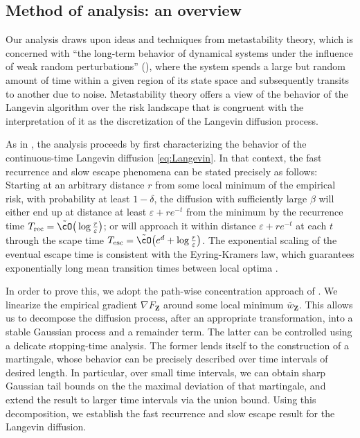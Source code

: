 \documentclass[final,12pt]{colt2018}
\numberwithin{equation}{section}
\numberwithin{equation}{section}
\def\bd#1{\mathbf{#1}}
\def\bZ{\bd{Z}}
\def\tO{{\tilde{\cO}}}
\def\barw{\overline{w}}
\def\eps{\varepsilon}
\begin{document}
\subsection{Method of analysis:  an overview}

Our analysis draws upon ideas and techniques from metastability theory, which is concerned with ``the long-term behavior of dynamical systems under the influence of weak random perturbations'' (\cite{bovier2016metastability}),  where the system spends a large but random amount of time within a given region of its state space and subsequently transits to another due to noise.  Metastability theory offers a view of the behavior of the Langevin algorithm over the risk landscape that is congruent with the interpretation of it as the discretization of the Langevin diffusion process. 

As in \cite*{rrt_colt17}, the analysis proceeds by first characterizing the behavior of the continuous-time Langevin diffusion \eqref{eq:Langevin}. In that context, the fast recurrence and slow escape phenomena can be stated precisely as follows:
Starting at an arbitrary distance $r$ from some local minimum of the empirical risk, with probability at least $1-\delta$, the diffusion with sufficiently large $\beta$ will either end up at distance at least $\eps+re^{-t}$ from the minimum by the recurrence time $T_{\rm rec} = \tO\big(\log \frac{r}{\eps}\big)$; or will approach it within distance $\eps + re^{-t}$ at each  $t$ through the scape time $T_{\rm esc} = \tO\big(e^d + \log \frac{r}{\eps}\big)$. The exponential scaling of the eventual escape time is consistent with the Eyring-Kramers law, which guarantees exponentially long mean transition times between local optima \citep{bovier2004metastability,Olivieri_Vares_metastability,bovier2016metastability}.

In order to prove this, we adopt the path-wise concentration approach of \cite{berglund_gentz_pathwise}.  We linearize the empirical gradient $\nabla F_\bZ$ around some local minimum $\barw_\bZ$. This allows us to decompose the diffusion process, after an appropriate transformation, into a stable Gaussian process and a remainder term.  The latter can be controlled using a delicate stopping-time analysis.  The former lends itself to the construction of a martingale, whose behavior can be precisely described over time intervals of desired length.  In particular, over small time intervals, we can obtain sharp Gaussian tail bounds on the the  maximal deviation of that martingale, and extend the result to larger time intervals via the union bound. Using this decomposition, we establish the fast recurrence and slow escape result for the Langevin diffusion.
\end{document}
